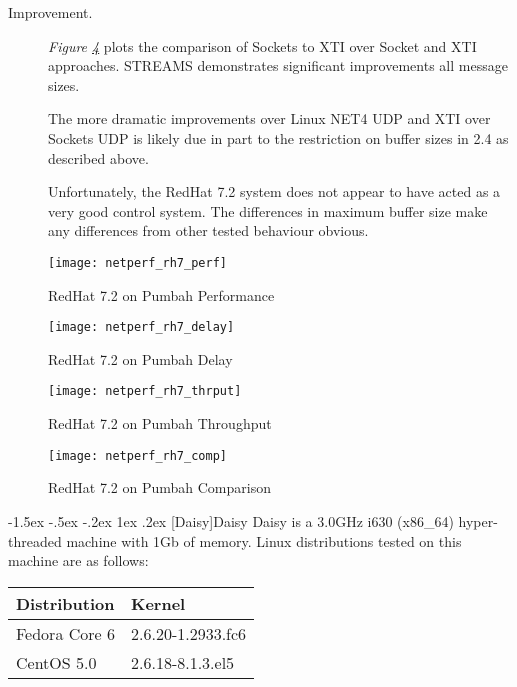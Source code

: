 \documentclass[letterpaper,final,notitlepage,twocolumn,10pt,twoside]{article}
\makeatletter
\renewcommand\subsection{\@startsection{subsection}{2}{\z@}%
                                     {-1.5ex \@plus -.5ex \@minus -.2ex}%
                                     {1ex \@plus .2ex}%
                                     {\normalfont\normalsize\bfseries}}
\makeatother
\begin{document}
\begin{description}
\item[Improvement.]

\textit{Figure \ref{figure:rh7comp}}
plots the comparison of Sockets to XTI over Socket and XTI approaches.  STREAMS demonstrates
significant improvements all message sizes.

The more dramatic improvements over Linux NET4 UDP and XTI over Sockets UDP is likely due in part to
the restriction on buffer sizes in 2.4 as described above.

Unfortunately, the RedHat 7.2 system does not appear to have acted as a very good control system.
The differences in maximum buffer size make any differences from other tested behaviour obvious.

\end{description}

\begin{figure}[p]
\center\texttt{[image: netperf\_rh7\_perf]}
\caption[RedHat 7.2 on Pumbah Performance]{RedHat 7.2 on Pumbah Performance}
\label{figure:rh7perf}
\end{figure}

\begin{figure}[p]
\center\texttt{[image: netperf\_rh7\_delay]}
\caption[RedHat 7.2 on Pumbah Delay]{RedHat 7.2 on Pumbah Delay}
\label{figure:rh7dly}
\end{figure}

\begin{figure}[p]
\center\texttt{[image: netperf\_rh7\_thrput]}
\caption[RedHat 7.2 on Pumbah Throughput]{RedHat 7.2 on Pumbah Throughput}
\label{figure:rh7thrput}
\end{figure}

\begin{figure}[pt]
\center\texttt{[image: netperf\_rh7\_comp]}
\caption[RedHat 7.2 on Pumbah Comparison]{RedHat 7.2 on Pumbah Comparison}
\label{figure:rh7comp}
\end{figure}

\subsection[Daisy]{Daisy}
Daisy is a 3.0GHz i630 (x86\_64) hyper-threaded machine with 1Gb of memory.
Linux distributions tested on this machine are as follows:

\small
\setlength{\tabcolsep}{0.4em}
\setlength{\arraycolsep}{0.4em}
\begin{tabular}{ll}\\
Distribution & Kernel\\
\hline
Fedora Core 6 & 2.6.20-1.2933.fc6\\
CentOS 5.0 & 2.6.18-8.1.3.el5\\
\end{tabular}\\[1.0ex]
\normalsize
\end{document}
